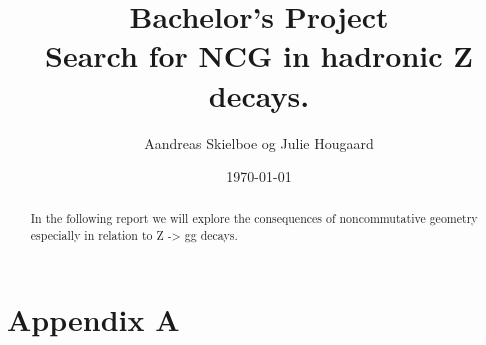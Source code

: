 \documentclass[11pt,a4paper,titlepage]{article}
\numberwithin{equation}{section}
\begin{document}
\title{Bachelor's Project\\Search for NCG in hadronic Z decays.}
\author{Aandreas Skielboe og Julie Hougaard}
\date{\today}
\maketitle
{}

\begin{abstract}
In the following report we will explore the consequences of noncommutative geometry especially in relation to Z -> gg decays.
\end{abstract}

\clearpage
\tableofcontents
\clearpage





















\clearpage



\clearpage



\section{Appendix A}







\end{document}

